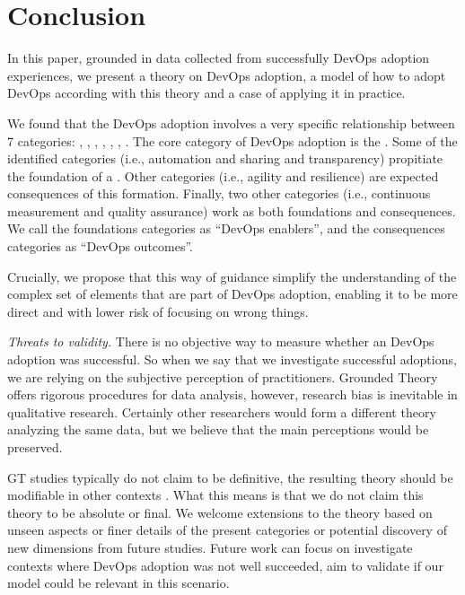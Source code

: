 \section{Conclusion} \label{sec:conclusion}

In this paper, grounded in data collected from successfully DevOps adoption
experiences, we present a theory on DevOps adoption, a model of how to adopt
DevOps according with this theory and a case of applying it in practice.

We found that the DevOps adoption involves a very specific relationship between
7 categories: , , \cc, , , , .
The core category of DevOps adoption is the \cc. Some of the
identified categories (i.e., automation and sharing and transparency) propitiate
the foundation of a \cc. Other categories
(i.e., agility and resilience) are expected consequences of this formation.
Finally, two other categories (i.e., continuous measurement and quality
assurance) work as both foundations and consequences. We call the foundations
categories as ``DevOps enablers'', and the consequences categories as ``DevOps outcomes''.

Crucially, we propose that this way of guidance simplify the understanding of the
complex set of elements that are part of DevOps adoption, enabling it to be
more direct and with lower risk of focusing on wrong things.

\emph{Threats to validity.} There is no objective way to measure whether an
DevOps adoption was successful. So when we say that we investigate successful
adoptions, we are relying on the subjective perception of practitioners. Grounded
Theory offers rigorous procedures for data analysis, however, research
bias is inevitable in qualitative research. Certainly other researchers would
form a different theory analyzing the same data, but we believe that the main perceptions
would be preserved.

GT studies typically do not claim to be definitive, the resulting theory should
be modifiable in other contexts \cite{hoda2012developing}. What this means is that we do not claim
this theory to be absolute or final. We welcome extensions to the theory based
on unseen aspects or finer details of the present categories or potential discovery
of new dimensions from future studies. Future work can focus on investigate contexts
where DevOps adoption was not well succeeded, aim to validate if our model could be
relevant in this scenario.
